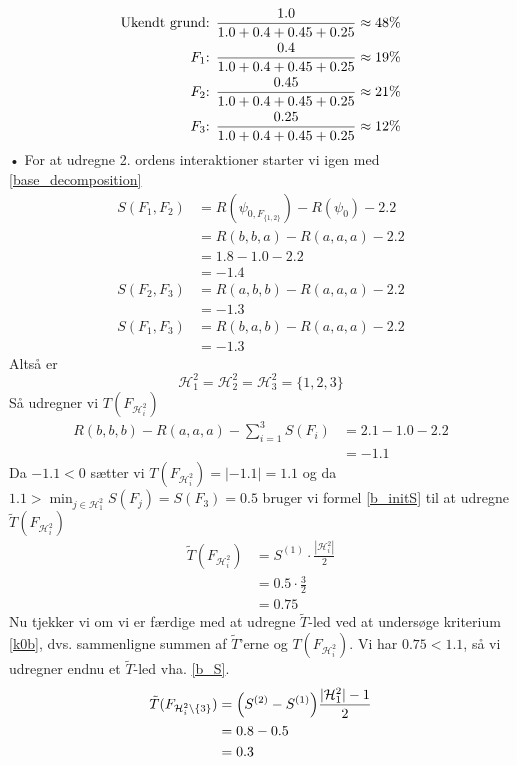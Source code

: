 \documentclass[a4paper, 12pt]{memoir}
\begin{document}
\begin{align*}
\textup{Ukendt grund: }&\frac{1.0}{1.0+0.4+0.45+0.25}\approx 48\%\\
\textup{$F_1$: }&\frac{0.4}{1.0+0.4+0.45+0.25}\approx 19\%\\
\textup{$F_2$: }&\frac{0.45}{1.0+0.4+0.45+0.25}\approx 21\%\\
\textup{$F_3$: }&\frac{0.25}{1.0+0.4+0.45+0.25}\approx 12\%\\
\end{align*}•
For at udregne 2. ordens interaktioner starter vi igen med \eqref{base_decomposition}
\begin{align*}
S(F_1,F_2)&=R(\psi_{0,F_{\{1,2\}}})-R(\psi_0)-2.2\\
&=R(b,b,a)-R(a,a,a)-2.2\\
&=1.8-1.0-2.2\\
&=-1.4\\
S(F_2,F_3)&=R(a,b,b)-R(a,a,a)-2.2\\
&=-1.3\\
S(F_1,F_3)&=R(b,a,b)-R(a,a,a)-2.2\\
&=-1.3
\end{align*}
Altså er 
\begin{equation*}
\mathcal H_1^2=\mathcal H_2^2=\mathcal H_3^2=\{1,2,3\}
\end{equation*}
Så udregner vi $T(F_{\mathcal H_i^2})$
\begin{align*}
R(b,b,b)-R(a,a,a)-\sum_{i=1}^3 S(F_i)&=2.1-1.0-2.2\\
&=-1.1
\end{align*}
Da $-1.1<0$ sætter vi $T(F_{\mathcal H_i^2})=|-1.1|=1.1$ og da $1.1>\min_{j\in \mathcal H_1^2} S(F_j)=S(F_3)=0.5$ bruger vi formel \eqref{b_initS} til at udregne $\tilde T(F_{\mathcal H_i^2})$
\begin{align*}
\tilde T(F_{\mathcal H_i^2})&=S^{(1)}\cdot \frac{|\mathcal H_i^2|}{2}\\
&=0.5\cdot \frac{3}{2}\\
&=0.75
\end{align*}
Nu tjekker vi om vi er færdige med at udregne $\tilde T$-led ved at undersøge kriterium \eqref{k0b}, dvs. sammenligne summen af $\tilde T$'erne og $T(F_{\mathcal H_i^2})$.  Vi har $0.75<1.1$, så vi udregner endnu et $\tilde T$-led vha. \eqref{b_S}. 
\begin{align*}
\tilde T(F_{\mathcal H_i^2\setminus\{3\}})&=\Bigl(S^{(2)}-S^{(1)}\Bigr)\frac{|\mathcal H_1^2|-1}{2}\\
&=0.8-0.5\\
&=0.3
\end{align*}
\end{document}

